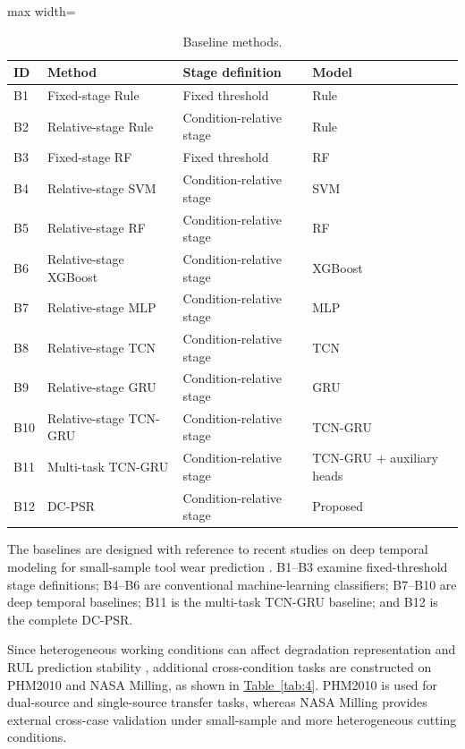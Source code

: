 \documentclass[a4paper,fleqn]{cas-sc}
\providecommand{\tabref}{}
\renewcommand{\tabref}[1]{\hyperref[#1]{Table~\ref*{#1}}}
\begin{document}
  \begin{table}[!htbp]
    \centering
    \scriptsize
  \caption{Baseline methods.}
    \label{tab:3}
    \begin{adjustbox}{max width=\textwidth}
      \begin{tabular}{llll}
        \toprule
        \textbf{ID} & \textbf{Method} & \textbf{Stage definition} & \textbf{Model} \\
        \midrule
        B1 & Fixed-stage Rule & Fixed threshold & Rule \\
        B2 & Relative-stage Rule & Condition-relative stage & Rule \\
        B3 & Fixed-stage RF & Fixed threshold & RF \\
        B4 & Relative-stage SVM & Condition-relative stage & SVM \\
        B5 & Relative-stage RF & Condition-relative stage & RF \\
        B6 & Relative-stage XGBoost & Condition-relative stage & XGBoost \\
        B7 & Relative-stage MLP & Condition-relative stage & MLP \\
        B8 & Relative-stage TCN & Condition-relative stage & TCN \\
        B9 & Relative-stage GRU & Condition-relative stage & GRU \\
        B10 & Relative-stage TCN-GRU & Condition-relative stage & TCN-GRU \\
        B11 & Multi-task TCN-GRU & Condition-relative stage & TCN-GRU + auxiliary heads \\
        B12 & DC-PSR & Condition-relative stage & Proposed \\
        \bottomrule
      \end{tabular}
    \end{adjustbox}
  \end{table}
  The baselines are designed with reference to recent studies on deep temporal modeling for small-sample tool wear prediction \citep{ref37,ref44}. B1--B3 examine fixed-threshold stage definitions; B4--B6 are conventional machine-learning classifiers; B7--B10 are deep temporal baselines; B11 is the multi-task TCN-GRU baseline; and B12 is the complete DC-PSR.

  Since heterogeneous working conditions can affect degradation representation and RUL prediction stability \citep{ref33}, additional cross-condition tasks are constructed on PHM2010 and NASA Milling, as shown in \tabref{tab:4}. PHM2010 is used for dual-source and single-source transfer tasks, whereas NASA Milling provides external cross-case validation under small-sample and more heterogeneous cutting conditions.
\end{document}
